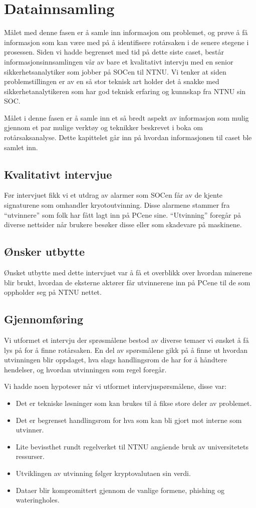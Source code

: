 \chapter{Datainnsamling}
Målet med denne fasen er å samle inn informasjon om problemet, og prøve å få informasjon som kan være med på å identifisere rotårsaken i de senere stegene i prosessen. Siden vi hadde begrenset med tid på dette siste caset, består informasjonsinnsamlingen vår av bare et kvalitativt intervju med en senior sikkerhetsanalytiker som jobber på SOCen til NTNU. Vi tenker at siden problemstillingen er av en så stor teknisk art holder det å snakke med sikkerhetanalytikeren som har god teknisk erfaring og kunnskap fra NTNU sin SOC.

Målet i denne fasen er å samle inn et så bredt aspekt av informasjon som mulig gjennom et par mulige verktøy og teknikker beskrevet i boka om rotårsaksanalyse\cite{RCA}. Dette kapittelet går inn på hvordan informasjonen til caset ble samlet inn.

\section{Kvalitativt intervjue}
Før intervjuet fikk vi et utdrag av alarmer som SOCen får av de kjente signaturene som omhandler kryotoutvinning. Disse alarmene stammer fra ``utvinnere'' som folk har fått lagt inn på PCene sine. ``Utvinning'' foregår på diverse nettsider når brukere besøker disse \cite{12577042320171101} eller som skadevare på maskinene. 

\section{Ønsker utbytte}
Ønsket utbytte med dette intervjuet var å få et overblikk over hvordan minerene blir brukt, hvordan de eksterne aktører får utvinnerene inn på PCene til de som oppholder seg på NTNU nettet. 

\section{Gjennomføring}
Vi utformet et intervju der sprøsmålene bestod av diverse temaer vi ønsket å få lys på for å finne rotårsaken. En del av spørsmålene gikk på å finne ut hvordan utvinningen blir oppdaget, hva slags handlingsrom de har for å håndtere hendelser, og hvordan utvinningen som regel foregår.

Vi hadde noen hypoteser når vi utformet intervjuspørsmålene, disse var:
\begin{itemize}
    \item Det er tekniske løsninger som kan brukes til å fikse store deler av problemet.
    \item Det er begrenset handlingsrom for hva som kan bli gjort mot interne som utvinner.
    \item Lite bevissthet rundt regelverket til NTNU angående bruk av universitetets ressurser.
    \item Utviklingen av utvinning følger kryptovalutaen sin verdi.
    \item Dataer blir kompromittert gjennom de vanlige formene, phishing og wateringholes.
\end{itemize}

